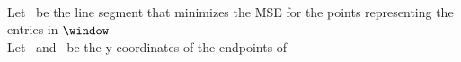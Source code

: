 


\beginAlgorithm
{}
\encodeWindowSizee\\
Let \segment\ be the line segment that minimizes the MSE for the points representing the entries in $\window$\\
Let \sO\ and \sN\ be the y-coordinates of the endpoints of \segment\\
\codeFloat{\sO}\\
\codeFloat{\sN}
